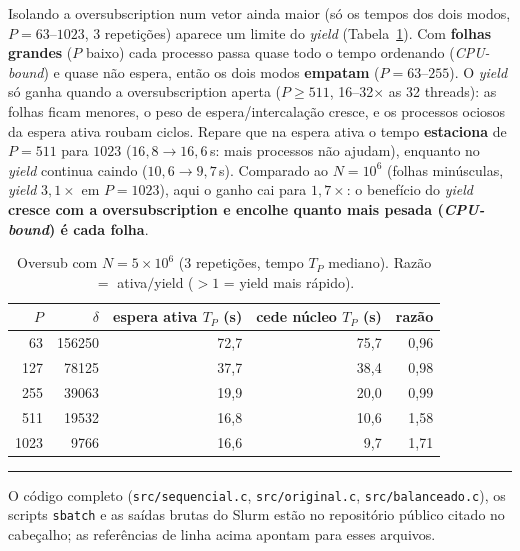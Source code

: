 \documentclass[10pt]{article}
\begin{document}
Isolando a oversubscription num vetor ainda maior (só os tempos dos dois modos, $P{=}63$--$1023$, 3
repetições) aparece um limite do \emph{yield} (Tabela~\ref{tab:5m}). Com \textbf{folhas grandes} ($P$
baixo) cada processo passa quase todo o tempo ordenando (\emph{CPU-bound}) e quase não espera, então os
dois modos \textbf{empatam} ($P{=}63$--$255$). O \emph{yield} só ganha quando a oversubscription aperta
($P\ge511$, 16--32$\times$ as 32 threads): as folhas ficam menores, o peso de espera/intercalação cresce,
e os processos ociosos da espera ativa roubam ciclos. Repare que na espera ativa o tempo \textbf{estaciona}
de $P{=}511$ para $1023$ ($16{,}8\to16{,}6$\,s: mais processos não ajudam), enquanto no \emph{yield}
continua caindo ($10{,}6\to9{,}7$\,s). Comparado ao $N{=}10^6$ (folhas minúsculas, \emph{yield} $3{,}1\times$
em $P{=}1023$), aqui o ganho cai para $1{,}7\times$: o benefício do \emph{yield} \textbf{cresce com a
oversubscription e encolhe quanto mais pesada (\emph{CPU-bound}) é cada folha}.

\begin{table}[htbp]\centering\footnotesize
\caption{Oversub com $N{=}5\times10^6$ (3 repetições, tempo $T_P$ mediano). Razão $=$ ativa$/$yield
(${>}1$ = yield mais rápido).}
\label{tab:5m}
\begin{tabular}{r r r r r}
\toprule
$P$ & $\delta$ & espera ativa $T_P$ (s) & cede núcleo $T_P$ (s) & razão\\
\midrule
  63 & 156250 & 72,7 & 75,7 & 0,96\\
 127 &  78125 & 37,7 & 38,4 & 0,98\\
 255 &  39063 & 19,9 & 20,0 & 0,99\\
 511 &  19532 & 16,8 & 10,6 & 1,58\\
1023 &   9766 & 16,6 &  9,7 & 1,71\\
\bottomrule
\end{tabular}
\end{table}

\vspace{6pt}
\hrule
\vspace{4pt}
{\footnotesize O código completo (\texttt{src/sequencial.c}, \texttt{src/original.c},
\texttt{src/balanceado.c}), os scripts \texttt{sbatch} e as saídas brutas do Slurm estão no repositório
público citado no cabeçalho; as referências de linha acima apontam para esses arquivos.}
\end{document}
